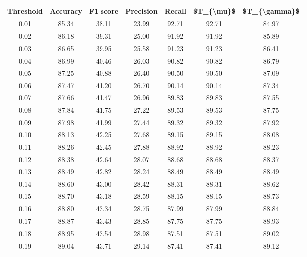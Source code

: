 \begin{tabular}{|c|c|c|c|c|c|c|}
\hline
 Threshold &  Accuracy &  F1 score &  Precision &  Recall &  \$T\_\{\textbackslash mu\}\$ &  \$T\_\{\textbackslash gamma\}\$ \\
\hline
      0.01 &     85.34 &     38.11 &      23.99 &   92.71 &      92.71 &         84.97 \\
      0.02 &     86.18 &     39.31 &      25.00 &   91.92 &      91.92 &         85.89 \\
      0.03 &     86.65 &     39.95 &      25.58 &   91.23 &      91.23 &         86.41 \\
      0.04 &     86.99 &     40.46 &      26.03 &   90.82 &      90.82 &         86.79 \\
      0.05 &     87.25 &     40.88 &      26.40 &   90.50 &      90.50 &         87.09 \\
      0.06 &     87.47 &     41.20 &      26.70 &   90.14 &      90.14 &         87.34 \\
      0.07 &     87.66 &     41.47 &      26.96 &   89.83 &      89.83 &         87.55 \\
      0.08 &     87.84 &     41.75 &      27.22 &   89.53 &      89.53 &         87.75 \\
      0.09 &     87.98 &     41.99 &      27.44 &   89.32 &      89.32 &         87.92 \\
      0.10 &     88.13 &     42.25 &      27.68 &   89.15 &      89.15 &         88.08 \\
      0.11 &     88.26 &     42.45 &      27.88 &   88.92 &      88.92 &         88.23 \\
      0.12 &     88.38 &     42.64 &      28.07 &   88.68 &      88.68 &         88.37 \\
      0.13 &     88.49 &     42.82 &      28.24 &   88.49 &      88.49 &         88.49 \\
      0.14 &     88.60 &     43.00 &      28.42 &   88.31 &      88.31 &         88.62 \\
      0.15 &     88.70 &     43.18 &      28.59 &   88.15 &      88.15 &         88.73 \\
      0.16 &     88.80 &     43.34 &      28.75 &   87.99 &      87.99 &         88.84 \\
      0.17 &     88.87 &     43.43 &      28.85 &   87.75 &      87.75 &         88.93 \\
      0.18 &     88.95 &     43.54 &      28.98 &   87.51 &      87.51 &         89.02 \\
      0.19 &     89.04 &     43.71 &      29.14 &   87.41 &      87.41 &         89.12 \\

\end{tabular}
